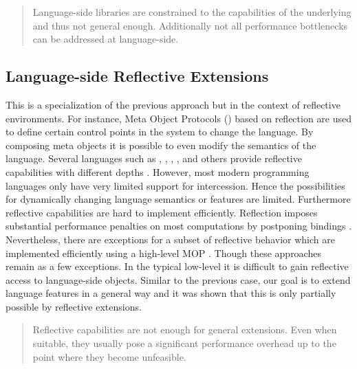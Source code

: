 \begin{quote}
Language-side libraries are constrained to the capabilities of the underlying \VM and thus not general enough. 
Additionally not all performance bottlenecks can be addressed at language-side.
\end{quote}

\subsection{Language-side Reflective Extensions}

This is a specialization of the previous approach but in the context of reflective environments.
For instance, Meta Object Protocols (\MOP) \cite{Kicz91a} based on reflection \cite{Maes87a} are used to define certain control points in the system to change the language.
By composing meta objects it is possible to even modify the semantics of the language. 
Several languages such as \PH, \ST, , , and others provide reflective capabilities with different depths \cite{Ande98a,Van10a}.
However, most modern programming languages only have very limited support for intercession.
Hence the possibilities for dynamically changing language semantics or features are limited. 
Furthermore reflective capabilities are hard to implement efficiently.
Reflection imposes substantial performance penalties on most computations by postponing bindings \cite{Male96a}. 
Nevertheless, there are exceptions for a subset of reflective behavior which are implemented efficiently using a high-level MOP \cite{Vran12a}.
Though these approaches remain as a few exceptions.
In the typical low-level \VM it is difficult to gain reflective access to language-side objects.
Similar to the previous case, our goal is to extend language features in a general way and it was shown that this is only partially possible by reflective extensions. 

\begin{quote}
Reflective capabilities are not enough for general extensions. Even when suitable, they usually pose a significant performance overhead up to the point where they become unfeasible.
\end{quote}

